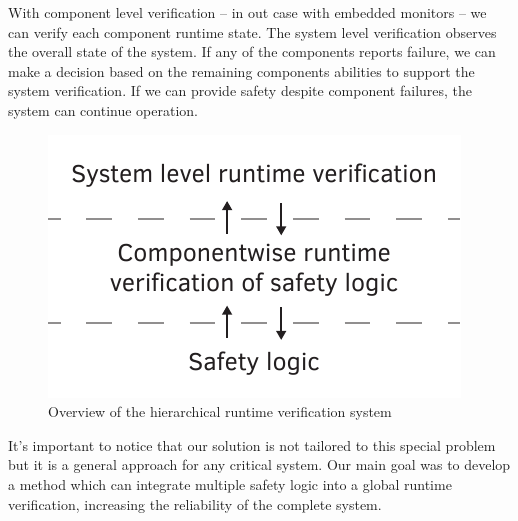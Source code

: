 With component level verification -- in out case with embedded monitors -- we can verify each component runtime state. The system level verification observes the overall state of the system. If any of the components reports failure, we can make a decision based on the remaining components abilities to support the system verification. If we can provide safety despite component failures, the system can continue operation.

\begin{figure}[h]
	\centering
	\includegraphics[width=0.4\linewidth]{include/figures/chapter_6/overview_1}
	\caption{Overview of the hierarchical runtime verification system}
	\label{fig:case_study:fov}
\end{figure}

It's important to notice that our solution is not tailored to this special problem but it is a general approach for any critical system. Our main goal was to develop a method which can integrate multiple safety logic into a global runtime verification, increasing the reliability of the complete system. 